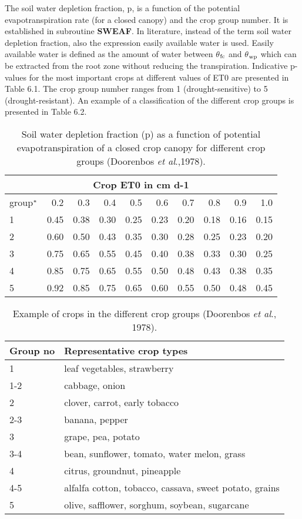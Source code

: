 The soil water depletion fraction, p, is 
a function of the potential evapotranspiration rate (for a closed canopy) and the crop group 
number. It is established in subroutine
{\bf SWEAF}. In literature, instead of the term soil water depletion fraction, also the 
expression easily available water is used. Easily available water is defined as the amount of
water between $\theta$$_{{\rm fc}}$ and $\theta$$_{{\rm wp}}$ which can be extracted from the root 
zone without reducing the
transpiration. Indicative p-values for the most important crops at different values of ET0
are presented in Table 6.1. The crop group number ranges from 1 (drought-sensitive) to 5
(drought-resistant). An example of a classification of the different crop groups is
presented in Table 6.2.

\begin{table}
	\caption{Soil water depletion fraction (p) as a function of potential evapotranspiration 
		of a closed crop canopy for different crop groups (Doorenbos {\it et al}.,1978).}
	\label{tbl:soilwatdeplfraction}
	\begin{tabularx}{\textwidth}{Xrrrrrrrrr}
		\hline
		\multicolumn{10}{c}{Crop ET0 in cm d-1}\\
		\hline
		group$^{\rm *}$ & 0.2 & 0.3 & 0.4 & 0.5 & 0.6 & 0.7 & 0.8 & 0.9 & 1.0\\
		1 & 0.45 & 0.38 & 0.30 & 0.25 & 0.23 & 0.20 & 0.18 & 0.16 & 0.15\\
		2 & 0.60 & 0.50 & 0.43 & 0.35 & 0.30 & 0.28 & 0.25 & 0.23 & 0.20\\
		3 & 0.75 & 0.65 & 0.55 & 0.45 & 0.40 & 0.38 & 0.33 & 0.30 & 0.25\\
		4 & 0.85 & 0.75 & 0.65 & 0.55 & 0.50 & 0.48 & 0.43 & 0.38 & 0.35\\
		5 & 0.92 & 0.85 & 0.75 & 0.65 & 0.60 & 0.55 & 0.50 & 0.48 & 0.45\\
		\hline 
	\end{tabularx} 
\end{table}


\begin{table}
	\caption{Example of crops in the different crop groups (Doorenbos {\it et al}., 1978).}
	\label{tbl:ExampleCropGroups}
	\begin{tabularx}{\textwidth}{lX}
		\hline
		Group no & Representative crop types\\
		\hline
		1 & leaf vegetables, strawberry\\     
		1-2 & cabbage, onion\\
		2 & clover, carrot, early tobacco\\     
		2-3 & banana, pepper\\
		3 & grape, pea, potato\\
		3-4 & bean, sunflower, tomato, water melon, grass\\
		4 & citrus, groundnut, pineapple\\
		4-5 & alfalfa cotton, tobacco, cassava, sweet potato, grains\\
		5 & olive, safflower, sorghum, soybean, sugarcane\\
		\hline
	\end{tabularx}
\end{table}

